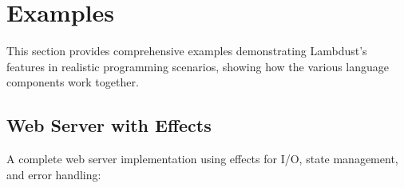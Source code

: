 \chapter{Examples}
\label{ch:examples}

This section provides comprehensive examples demonstrating Lambdust's features in realistic programming scenarios, showing how the various language components work together.

\section{Web Server with Effects}
\label{sec:web-server}

A complete web server implementation using effects for I/O, state management, and error handling:

